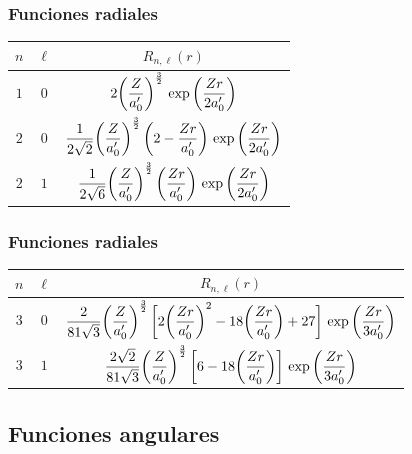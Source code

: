 \documentclass[12pt]{beamer}
\begin{document}
\begin{frame}
\frametitle{Funciones radiales}
\begin{table}[H]
\centering
\large
\renewcommand{\arraystretch}{1.5}
\begin{tabular}{|c | c | c|} \hline
$n$ & $\ell$ & $R_{n, \ell} (r)$ \\ \hline
$1$ & $0$ & $2 \bigg( \dfrac{Z}{{a}^{\prime}_{0}} \bigg)^{\frac{3}{2}} \, \exp\bigg( \dfrac{Z r}{2 {a}^{\prime}_{0}} \bigg)$ \\ \hline
$2$ & $0$ & $\dfrac{1}{2 \sqrt{2}} \bigg( \dfrac{Z}{{a}^{\prime}_{0}} \bigg)^{\frac{3}{2}} \, \bigg( 2 - \dfrac{Z r}{{a}^{\prime}_{0}} \bigg) \, \exp\bigg( \dfrac{Z r}{2 {a}^{\prime}_{0}} \bigg)$ \\ \hline
$2$ & $1$ & $\dfrac{1}{2 \sqrt{6}} \bigg( \dfrac{Z}{{a}^{\prime}_{0}} \bigg)^{\frac{3}{2}} \, \bigg( \dfrac{Z r}{{a}^{\prime}_{0}} \bigg) \, \exp\bigg( \dfrac{Z r}{2 {a}^{\prime}_{0}} \bigg)$ \\ \hline
\end{tabular}
\end{table}
\end{frame}
\begin{frame}
\frametitle{Funciones radiales}
\begin{table}[H]
\centering
\renewcommand{\arraystretch}{1.5}
\fontsize{12}{12}\selectfont
\begin{tabular}{|c | c | c|} \hline
$n$ & $\ell$ & $R_{n, \ell} (r)$ \\ \hline
$3$ & $0$ & $\dfrac{2}{81 \sqrt{3}} \bigg( \dfrac{Z}{{a}^{\prime}_{0}} \bigg)^{\frac{3}{2}} \, \bigg[ 2 \bigg( \dfrac{Z r}{{a}^{\prime}_{0}} \bigg)^{2} - 18 \bigg( \dfrac{Z r}{{a}^{\prime}_{0}} \bigg) + 27 \bigg] \, \exp\bigg( \dfrac{Z r}{3{a}^{\prime}_{0}} \bigg)$ \\ \hline
$3$ & $1$ & $\dfrac{2 \sqrt{2}}{81 \sqrt{3}} \bigg( \dfrac{Z}{{a}^{\prime}_{0}} \bigg)^{\frac{3}{2}} \, \bigg[ 6 - 18 \bigg( \dfrac{Z r}{{a}^{\prime}_{0}} \bigg) \bigg] \, \exp\bigg( \dfrac{Z r}{3{a}^{\prime}_{0}} \bigg)$ \\ \hline
\end{tabular}
\end{table}
\end{frame}

\subsection*{Funciones angulares}
\end{document}
